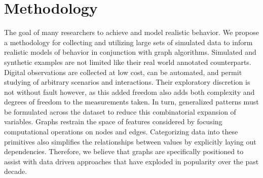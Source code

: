 \documentclass[12pt]{report}
\begin{document}

\section{Methodology}\label{sec:method}



The goal of many researchers to achieve and model realistic behavior. 
We propose a methodology for collecting and utilizing large sets 
of simulated data to inform realistic models of behavior in conjunction with graph algorithms. 
Simulated and synthetic examples are not limited like their real world annotated counterparts.
Digital observations are collected at low cost, can be automated,
and permit studying of arbitrary scenarios and interactions.
Their exploratory discretion is not without fault however,
as this added freedom also adds both complexity and degrees of freedom to the measurements taken.
In turn, generalized patterns must be formulated across the dataset to reduce
this combinatorial expansion of variables.
Graphs restrain the space of features considered by
focusing computational operations on nodes and edges.
Categorizing data into these primitives also simplifies the relationships between values 
by explicitly laying out dependencies.
Therefore, we believe that graphs are specifically positioned to assist with
data driven approaches that have exploded in popularity over the past decade. 
\end{document}

